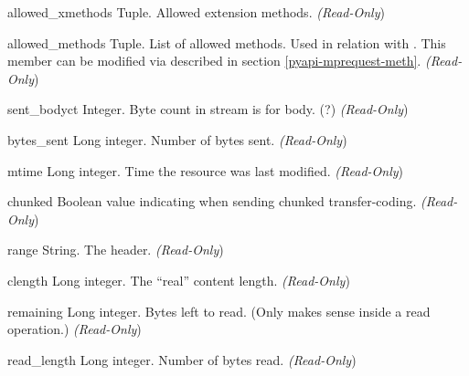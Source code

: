 \begin{memberdesc}[request]{allowed_xmethods}
  Tuple. Allowed extension methods.
  \emph{(Read-Only})
\end{memberdesc}

\begin{memberdesc}[request]{allowed_methods}
  Tuple. List of allowed methods. Used in relation with
  . This member can be modified via  
  described in section \ref{pyapi-mprequest-meth}.
  \emph{(Read-Only})
\end{memberdesc}

\begin{memberdesc}[request]{sent_bodyct}
  Integer. Byte count in stream is for body. (?)
  \emph{(Read-Only})
\end{memberdesc}

\begin{memberdesc}[request]{bytes_sent}
  Long integer. Number of bytes sent.
  \emph{(Read-Only})
\end{memberdesc}

\begin{memberdesc}[request]{mtime}
  Long integer. Time the resource was last modified.
  \emph{(Read-Only})
\end{memberdesc}

\begin{memberdesc}[request]{chunked}
  Boolean value indicating when sending chunked transfer-coding.
  \emph{(Read-Only})
\end{memberdesc}

\begin{memberdesc}[request]{range}
  String. The  header.
  \emph{(Read-Only})
\end{memberdesc}

\begin{memberdesc}[request]{clength}
  Long integer. The ``real'' content length.
  \emph{(Read-Only})
\end{memberdesc}

\begin{memberdesc}[request]{remaining}
  Long integer. Bytes left to read. (Only makes sense inside a read
  operation.)
  \emph{(Read-Only})
\end{memberdesc}

\begin{memberdesc}[request]{read_length}
  Long integer. Number of bytes read.
  \emph{(Read-Only})
\end{memberdesc}

